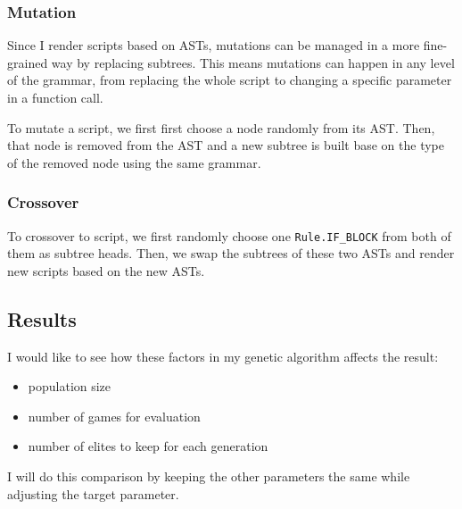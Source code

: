 \documentclass[]{article}
\providecommand{\tightlist}{%
  \setlength{\itemsep}{0pt}\setlength{\parskip}{0pt}}
\begin{document}
\subsubsection{Mutation}\label{mutation}

Since I render scripts based on ASTs, mutations can be managed in a more
fine-grained way by replacing subtrees. This means mutations can happen
in any level of the grammar, from replacing the whole script to changing
a specific parameter in a function call.

To mutate a script, we first first choose a node randomly from its AST.
Then, that node is removed from the AST and a new subtree is built base
on the type of the removed node using the same grammar.

\subsubsection{Crossover}\label{crossover}

To crossover to script, we first randomly choose one
\texttt{Rule.IF\_BLOCK} from both of them as subtree heads. Then, we
swap the subtrees of these two ASTs and render new scripts based on the
new ASTs.

\subsection{Results}\label{results}

I would like to see how these factors in my genetic algorithm affects
the result:

\begin{itemize}
\tightlist
\item
  population size
\item
  number of games for evaluation
\item
  number of elites to keep for each generation
\end{itemize}

I will do this comparison by keeping the other parameters the same while
adjusting the target parameter.
\end{document}
